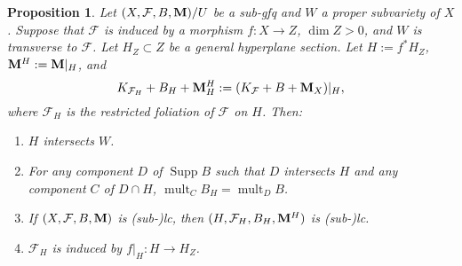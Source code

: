 \documentclass[11pt]{amsart}
\numberwithin{equation}{section}
\newcommand{\Mm}{{\bf{M}}}
\newcommand{\Supp}{\operatorname{Supp}}
\newcommand{\mult}{\operatorname{mult}}
\newcommand{\Ff}{\mathcal{F}}
\newtheorem{prop}[thm]{Proposition}
\theoremstyle{definition}
\theoremstyle{definition}
\theoremstyle{definition}
\begin{document}
\begin{prop}\label{prop: general hyperplane invariant}
Let $(X,\Ff,B,\Mm)/U$ be a sub-gfq and $W$ a proper subvariety of $X$. Suppose that $\Ff$ is induced by a morphism $f: X\rightarrow Z$, $\dim Z>0$, and $W$ is transverse to $\Ff$. Let $H_Z\subset Z$ be a general hyperplane section. Let $H:=f^*H_Z$, $\Mm^H:=\Mm|_H$, and 
$$K_{\Ff_H}+B_H+\Mm_H^H:=(K_{\Ff}+B+\Mm_X)|_H,$$ 
where $\Ff_H$ is the restricted foliation of $\Ff$ on $H$. Then:
\begin{enumerate}
    \item $H$ intersects $W$.
    \item For any component $D$ of $\Supp B$ such that $D$ intersects $H$ and any component $C$ of $D\cap H$, $\mult_CB_H=\mult_DB$.
    \item If $(X,\Ff,B,\Mm)$ is (sub-)lc, then $(H,\Ff_H,B_H,\Mm^H)$ is (sub-)lc.
    \item $\Ff_H$ is induced by $f|_H: H\rightarrow H_Z$.
\end{enumerate}
\end{prop}
\end{document}
